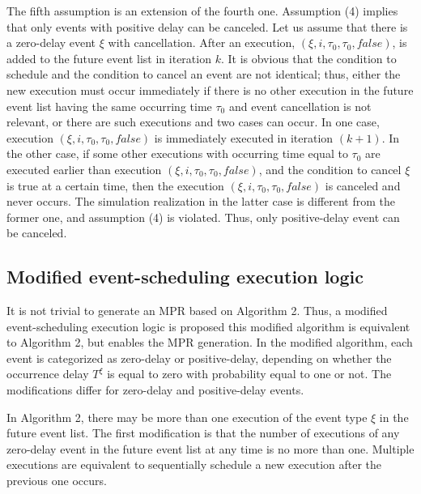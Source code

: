\documentclass[suppldata]{interact}
\theoremstyle{plain}
\theoremstyle{definition}
\theoremstyle{remark}
\begin{document}
The fifth assumption is an extension of the fourth one. Assumption (4) implies that only events with positive delay can be canceled. Let us assume that there is a zero-delay event ${\xi}$ with cancellation. After an execution, $(\xi,i,\tau_0,\tau_0,false)$, is added to the future event list in iteration $k$. It is obvious that the condition to schedule and the condition to cancel an event are not identical; thus, either the new execution must occur immediately if there is no other execution in the future event list having the same occurring time $\tau_0$ and event cancellation is not relevant, or there are such executions and two cases can occur. In one case, execution $(\xi,i,\tau_0,\tau_0,false)$ is immediately executed in iteration $(k+1)$. In the other case, if some other executions with occurring time equal to $\tau_0$ are executed earlier than execution $(\xi,i,\tau_0,\tau_0,false)$, and the condition to cancel $\xi$ is true at a certain time, then the execution $(\xi,i,\tau_0,\tau_0,false)$ is canceled and never occurs. The simulation realization in the latter case is different from the former one, and assumption (4) is violated. Thus, only positive-delay event can be canceled.



\subsection{Modified event-scheduling execution logic} \label{sec:MPR_procedure}

It is not trivial to generate an MPR based on Algorithm 2. Thus, a modified event-scheduling execution logic is proposed this modified algorithm is equivalent to Algorithm 2, but enables the MPR generation. In the modified algorithm, each event is categorized as zero-delay or positive-delay, depending on whether the occurrence delay $T^{\xi}$ is equal to zero with probability equal to one or not. The modifications differ for zero-delay and positive-delay events. 

In Algorithm 2, there may be more than one execution of the event type $\xi$ in the future event list. The first modification is that the number of executions of any zero-delay event in the future event list at any time is no more than one. Multiple executions are equivalent to sequentially schedule a new execution after the previous one occurs. 
\end{document}
